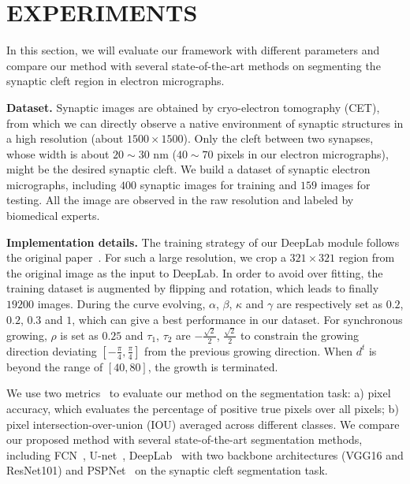 \section{EXPERIMENTS}
\label{sec:experiments}
In this section, we will evaluate our framework with different parameters and compare our method with several state-of-the-art methods on segmenting the synaptic cleft region in electron micrographs.

\noindent\textbf{Dataset.}
Synaptic images are obtained by cryo-electron tomography (CET), from which we can directly observe a native environment of synaptic structures in a high resolution (about $1500\times 1500$). 
%
Only the cleft between two synapses, whose width is about $20\sim30$ nm ($40\sim70$ pixels in our electron micrographs), might be the desired synaptic cleft.
%
We build a dataset of synaptic electron micrographs, including $400$ synaptic images for training and $159$ images for testing.
%
All the image are observed in the raw resolution and labeled by biomedical experts.

\noindent\textbf{Implementation details.}
The training strategy of our DeepLab module follows the original paper~\cite{Chen2016a}.
For such a large resolution, we crop a $321\times 321$ region from the original image as the input to DeepLab.
In order to avoid over fitting, the training dataset is augmented by flipping and rotation, which leads to finally $19200$ images.
%
During the curve evolving, $\alpha$, $\beta$, $\kappa$ and $\gamma$ are respectively set as $0.2$, $0.2$, $0.3$ and $1$, which can give a best performance in our dataset.
For synchronous growing, $\rho$ is set as $0.25$ and $\tau_1$, $\tau_2$ are $-\frac{\sqrt{2}}{2}$, $\frac{\sqrt{2}}{2}$ to constrain the growing direction deviating $[-\frac{\pi}{4},\frac{\pi}{4}]$ from the previous growing direction.
When $d^{t}$ is beyond the range of $[40,80]$, the growth is terminated.




We use two metrics~\cite{Cheng2017} to evaluate our method on the segmentation task:
a) pixel accuracy, which evaluates the percentage of positive true pixels over all pixels;
b) pixel intersection-over-union (IOU) averaged across different classes.
%
We compare our proposed method with several state-of-the-art segmentation methods, including FCN~\cite{Long2015}, U-net~\cite{Ronneberger2015}, DeepLab~\cite{Chen2016a} with two backbone architectures (VGG16 and ResNet101) and PSPNet~\cite{Zhao2016} on the synaptic cleft segmentation task. 


